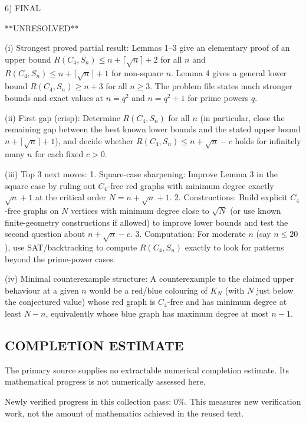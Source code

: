 6) FINAL

**UNRESOLVED**

(i) Strongest proved partial result: Lemmas 1–3 give an elementary proof of an upper bound $R(C_4,S_n)\le n+\lceil\sqrt n\rceil+2$ for all $n$ and $R(C_4,S_n)\le n+\lceil\sqrt n\rceil+1$ for non-square $n$. Lemma 4 gives a general lower bound $R(C_4,S_n)\ge n+3$ for all $n\ge 3$. The problem file states much stronger bounds and exact values at $n=q^2$ and $n=q^2+1$ for prime powers $q$.

(ii) First gap (crisp): Determine $R(C_4,S_n)$ for all $n$ (in particular, close the remaining gap between the best known lower bounds and the stated upper bound $n+\lceil\sqrt n\rceil+1$), and decide whether $R(C_4,S_n)\le n+\sqrt n - c$ holds for infinitely many $n$ for each fixed $c>0$.

(iii) Top 3 next moves:
1. Square-case sharpening: Improve Lemma 3 in the square case by ruling out $C_4$-free red graphs with minimum degree exactly $\sqrt n +1$ at the critical order $N=n+\sqrt n +1$.
2. Constructions: Build explicit $C_4$-free graphs on $N$ vertices with minimum degree close to $\sqrt N$ (or use known finite-geometry constructions if allowed) to improve lower bounds and test the second question about $n+\sqrt n-c$.
3. Computation: For moderate $n$ (say $n\le 20$), use SAT/backtracking to compute $R(C_4,S_n)$ exactly to look for patterns beyond the prime-power cases.

(iv) Minimal counterexample structure: A counterexample to the claimed upper behaviour at a given $n$ would be a red/blue colouring of $K_{N}$ (with $N$ just below the conjectured value) whose red graph is $C_4$-free and has minimum degree at least $N-n$, equivalently whose blue graph has maximum degree at most $n-1$.



\subsection*{COMPLETION ESTIMATE}
The primary source supplies no extractable numerical completion estimate. Its mathematical progress is not numerically assessed here.

Newly verified progress in this collection pass: $0\%$. This measures new verification work, not the amount of mathematics achieved in the reused text.
